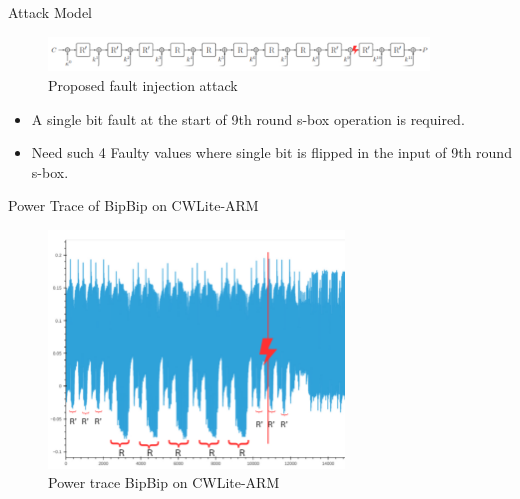 \documentclass{beamer}
\newenvironment{tres important}[2][]{
	\setkeys{EmphEqEnv}{#2}
	\setkeys{EmphEqOpt}{box={\setlength{\fboxsep}{10pt}\fcolorbox{myNewColorA}{white}},#1}
	\EmphEqMainEnv}
{\endEmphEqMainEnv}
\begin{document}
\begin{frame}[fragile]{Attack Model}
  \begin{figure}[h]
    \centering
    \includegraphics[width=0.9\textwidth]{images/bipbip_attack.png}
    \caption{Proposed fault injection attack}
    \label{fig:bipbip_attack}
\end{figure}
\begin{itemize}
\item A single bit fault at the start of 9th round s-box operation is required. 
\item Need such 4 Faulty values where single bit is flipped in the input of 9th round s-box.
\end{itemize}
\end{frame}
\begin{frame}[fragile]{Power Trace of BipBip on CWLite-ARM}
  \begin{figure}[h]
    \centering
    \includegraphics[width=0.7\textwidth]{images/bipbip_powertrace.png}
    \caption{Power trace BipBip on CWLite-ARM}
    \label{fig:bipbip_powertrace}
\end{figure}
\end{frame}
\end{document}
